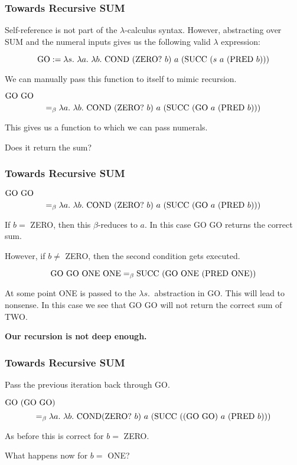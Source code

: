 \documentclass{beamer}
\begin{document}
\begin{frame}
	\frametitle{Towards Recursive SUM}

	Self-reference is not part of the $\lambda$-calculus syntax. However, abstracting over SUM and the numeral inputs gives us the following valid $\lambda$ expression: 

	$$\GO := \lambda s. \ \lambda a. \ \lambda b. \ \COND \ (\ISITZERO \ b) \ a \ (\SUCC \ (s \ a \ (\PRED \ b))) $$

	We can manually pass this function to itself to mimic recursion. 
	
	$\text{GO} \ \text{GO} $
	$$=_{\beta} \lambda a. \ \lambda b. \ \COND \ (\ISITZERO \ b) \ a \ (\SUCC \ (\GO \ a \ (\PRED \ b))) $$

	This gives us a function to which we can pass numerals. 
	
	Does it return the sum?


\end{frame}

\begin{frame}
	\frametitle{Towards Recursive SUM}

	$\text{GO} \ \text{GO} $
	$$=_{\beta} \lambda a. \ \lambda b. \ \COND \ (\ISITZERO \ b) \ a \ (\SUCC \ (\GO \ a \ (\PRED \ b))) $$

	If $b =$ ZERO, then this $\beta$-reduces to $a$.
	In this case GO GO returns the correct sum. 

	\vspace{2mm}
	
	However, if $b \neq $ ZERO, then the second condition gets executed. 

	$$\text{GO} \ \text{GO} \ \text{ONE} \ \text{ONE} =_{\beta} \text{SUCC} \ (\text{GO} \ \text{ONE} \ (\text{PRED} \ \text{ONE}))$$

	At some point ONE is passed to the $\lambda s. \ $ abstraction in GO. This will lead to nonsense. In this case we see that GO GO will not return the correct sum of TWO.

	\vspace{5mm}

	{\bf Our recursion is not deep enough.}
\end{frame}

\begin{frame}
	\frametitle{Towards Recursive SUM}

	Pass the previous iteration back through GO. 

	$ \text{GO} \ (\text{GO} \ \text{GO})$
	$$=_{\beta} \lambda a. \ \lambda b. \ \COND (\ISITZERO \ b) \ a \ (\SUCC \ ((\GO \ \GO) \ a \ (\PRED \ b))) $$

	As before this is correct for $b = $ ZERO. 
	
	What happens now for $b = $ ONE?

\end{frame}
\end{document}
